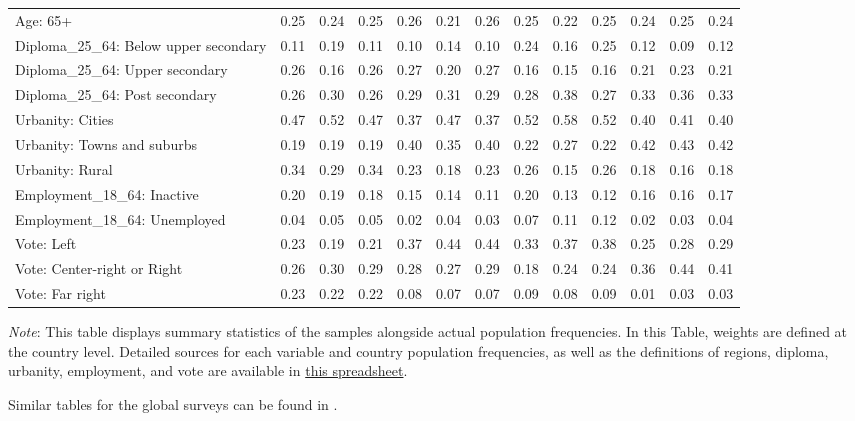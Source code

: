 \documentclass[12pt,english]{article}
\begin{document}
\begin{table}[h]
{{\begin{tabular}[t]{lllllllllllll}
Age: 65+ & 0.25 & 0.24 & 0.25 & 0.26 & 0.21 & 0.26 & 0.25 & 0.22 & 0.25 & 0.24 & 0.25 & 0.24\\
\addlinespace
Diploma\_25\_64: Below upper secondary & 0.11 & 0.19 & 0.11 & 0.10 & 0.14 & 0.10 & 0.24 & 0.16 & 0.25 & 0.12 & 0.09 & 0.12\\
Diploma\_25\_64: Upper secondary & 0.26 & 0.16 & 0.26 & 0.27 & 0.20 & 0.27 & 0.16 & 0.15 & 0.16 & 0.21 & 0.23 & 0.21\\
Diploma\_25\_64: Post secondary & 0.26 & 0.30 & 0.26 & 0.29 & 0.31 & 0.29 & 0.28 & 0.38 & 0.27 & 0.33 & 0.36 & 0.33\\
\addlinespace
Urbanity: Cities & 0.47 & 0.52 & 0.47 & 0.37 & 0.47 & 0.37 & 0.52 & 0.58 & 0.52 & 0.40 & 0.41 & 0.40\\
Urbanity: Towns and suburbs & 0.19 & 0.19 & 0.19 & 0.40 & 0.35 & 0.40 & 0.22 & 0.27 & 0.22 & 0.42 & 0.43 & 0.42\\
Urbanity: Rural & 0.34 & 0.29 & 0.34 & 0.23 & 0.18 & 0.23 & 0.26 & 0.15 & 0.26 & 0.18 & 0.16 & 0.18\\
\addlinespace
Employment\_18\_64: Inactive & 0.20 & 0.19 & 0.18 & 0.15 & 0.14 & 0.11 & 0.20 & 0.13 & 0.12 & 0.16 & 0.16 & 0.17\\
Employment\_18\_64: Unemployed & 0.04 & 0.05 & 0.05 & 0.02 & 0.04 & 0.03 & 0.07 & 0.11 & 0.12 & 0.02 & 0.03 & 0.04\\
\addlinespace
Vote: Left & 0.23 & 0.19 & 0.21 & 0.37 & 0.44 & 0.44 & 0.33 & 0.37 & 0.38 & 0.25 & 0.28 & 0.29\\
Vote: Center-right or Right & 0.26 & 0.30 & 0.29 & 0.28 & 0.27 & 0.29 & 0.18 & 0.24 & 0.24 & 0.36 & 0.44 & 0.41\\
Vote: Far right & 0.23 & 0.22 & 0.22 & 0.08 & 0.07 & 0.07 & 0.09 & 0.08 & 0.09 & 0.01 & 0.03 & 0.03\\
\bottomrule
\end{tabular}         }
    }
    {\footnotesize \textit{Note}: This table displays summary statistics of the samples alongside actual population frequencies. In this Table, weights are defined at the country level.  %
    Detailed sources for each variable and country population frequencies, as well as the definitions of regions, diploma, urbanity, employment, and vote are available in \href{https://github.com/bixiou/international_attitudes_toward_global_policies/raw/main/questionnaire/specificities.xlsx}{this spreadsheet}. %
    }
\end{table}

Similar tables for the global surveys can be found in \citet{dechezlepretre_fighting_2022}.
\end{document}
